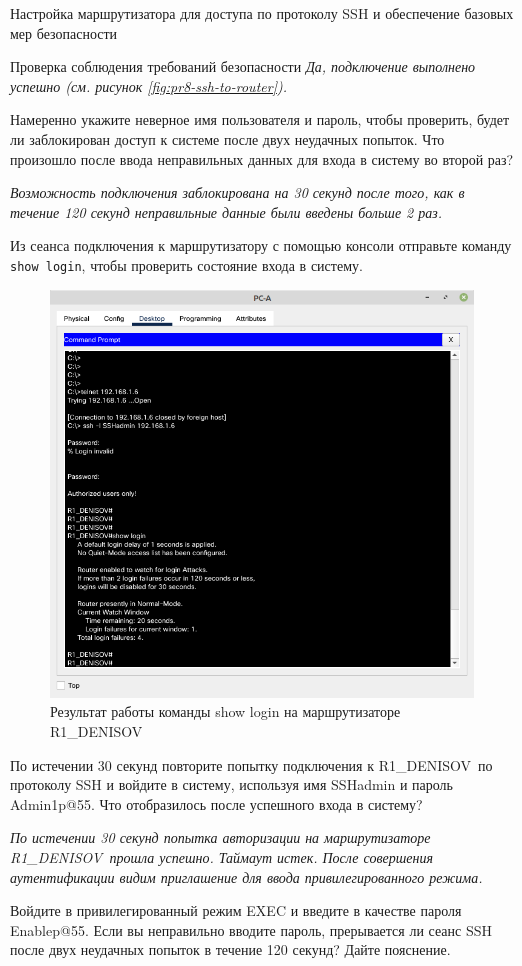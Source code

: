\documentclass[a4paper,14pt]{extarticle}
\newcommand{\router}{R1\_DENISOV~}
\begin{document}
\begin{mypart}{Настройка маршрутизатора для доступа по протоколу SSH и
		обеспечение базовых мер безопасности}
\begin{step}{Проверка соблюдения требований безопасности}
\ans \textit{Да, подключение выполнено успешно (см. рисунок \ref{fig:pr8-ssh-to-router}).}


\q Намеренно укажите неверное имя пользователя и пароль, чтобы проверить, будет ли
заблокирован доступ к системе после двух неудачных попыток. Что произошло после ввода неправильных данных для входа в систему во второй раз?

\ans \textit{Возможность подключения заблокирована на 30 секунд после того, как в течение 120 секунд неправильные данные были введены больше 2 раз.}

\q Из сеанса подключения к маршрутизатору с помощью консоли отправьте команду \texttt{show login},
чтобы проверить состояние входа в систему. 


\ans %
\begin{figure}[h!]
	\centering
	\includegraphics[width=0.6\linewidth]{images/pr8-show-login}
	\caption{Результат работы команды show login на маршрутизаторе \router}
	\label{fig:pr8-show-login}
\end{figure}

\q По истечении 30 секунд повторите попытку подключения к \router по протоколу SSH и
войдите в систему, используя имя SSHadmin и пароль Admin1p@55. Что отобразилось после успешного входа в систему?


\ans \textit{По истечении 30 секунд попытка авторизации на маршрутизаторе \router прошла успешно. Таймаут истек. 	После совершения аутентификации видим приглашение для ввода привилегированного режима.}

\q Войдите в привилегированный режим EXEC и введите в качестве пароля Enablep@55.
Если вы неправильно вводите пароль, прерывается ли сеанс SSH после двух неудачных попыток в
течение 120 секунд? Дайте пояснение.
\end{step}

\end{mypart}
\end{document}
